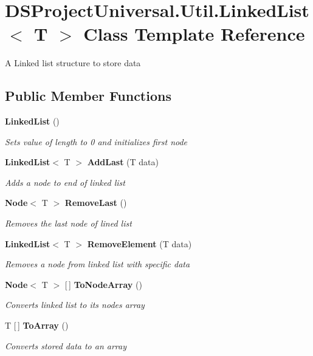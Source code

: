 \section{D\+S\+Project\+Universal.\+Util.\+Linked\+List$<$ T $>$ Class Template Reference}
\label{class_d_s_project_universal_1_1_util_1_1_linked_list}


A Linked list structure to store data 


\subsection*{Public Member Functions}
\begin{DoxyCompactItemize}
\item 
\mbox{\label{class_d_s_project_universal_1_1_util_1_1_linked_list_a284d3013f6a4040eda6283a546f0f0cb}} 
\textbf{ Linked\+List} ()
\begin{DoxyCompactList}\small\item\em Sets value of length to 0 and initializes first node\end{DoxyCompactList}\item 
\textbf{ Linked\+List}$<$ T $>$ \textbf{ Add\+Last} (T data)
\begin{DoxyCompactList}\small\item\em Adds a node to end of linked list\end{DoxyCompactList}\item 
\textbf{ Node}$<$ T $>$ \textbf{ Remove\+Last} ()
\begin{DoxyCompactList}\small\item\em Removes the last node of lined list\end{DoxyCompactList}\item 
\textbf{ Linked\+List}$<$ T $>$ \textbf{ Remove\+Element} (T data)
\begin{DoxyCompactList}\small\item\em Removes a node from linked list with specific data\end{DoxyCompactList}\item 
\textbf{ Node}$<$ T $>$ [$\,$] \textbf{ To\+Node\+Array} ()
\begin{DoxyCompactList}\small\item\em Converts linked list to its node\textquotesingle{}s array\end{DoxyCompactList}\item 
T [$\,$] \textbf{ To\+Array} ()
\begin{DoxyCompactList}\small\item\em Converts stored data to an array\end{DoxyCompactList}\end{DoxyCompactItemize}
